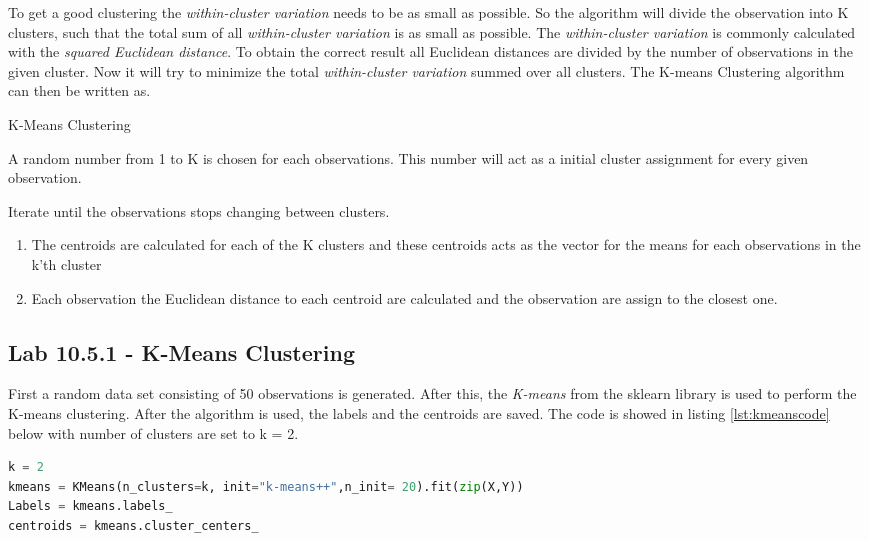 To get a good clustering the \emph{within-cluster variation} needs to be as small as possible. So the algorithm will divide the observation into K clusters, such that the total sum of all \emph{within-cluster variation} is as small as possible. The \emph{within-cluster variation} is commonly calculated with the \emph{squared Euclidean distance}. To obtain the correct result all Euclidean distances are divided by the number of observations in the given cluster. Now it will try to minimize the total \emph{within-cluster variation} summed over all clusters.
The K-means Clustering algorithm can then be written as.

\begin{algorithm}
	\caption{K-Means Clustering}
	\label{algo:KMeansClustering}
	\begin{algorithmic}[1]
		\State A random number from 1 to K is chosen for each observations. This number will act as a initial cluster assignment for every given observation.
		
		\State 
		Iterate until the observations stops changing between clusters.
		\begin{enumerate}[label=(\alph*)]
			\item The centroids are calculated for each of the K clusters and these centroids acts as the vector for the means for each observations in the k'th cluster
			
			\item Each observation the Euclidean distance to each centroid are calculated and the observation are assign to the closest one.
		\end{enumerate}
	\end{algorithmic}
\end{algorithm}

\subsection{Lab 10.5.1 - K-Means Clustering}
First a random data set consisting of 50 observations is generated. After this, the \emph{K-means} from the sklearn library is used to perform the K-means clustering.
After the algorithm is used, the labels and the centroids are saved. The code is showed in listing \ref{lst:kmeanscode} below with number of clusters are set to k = 2.
\begin{lstlisting}[language=Python, label=lst:kmeanscode, caption=The KMean function and the code which saves the labels and the centroids]
k = 2
kmeans = KMeans(n_clusters=k, init="k-means++",n_init= 20).fit(zip(X,Y))
Labels = kmeans.labels_
centroids = kmeans.cluster_centers_
\end{lstlisting}


